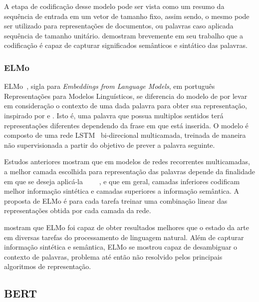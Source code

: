 A etapa de codificação desse modelo pode ser vista como um resumo da sequência
de entrada em um vetor de tamanho fixo, assim sendo, o mesmo pode ser utilizado
para representações de documentos, ou palavras caso aplicada sequência de
tamanho unitário.
\citet{cho14} demostram brevemente em seu trabalho que a codificação é capaz de
capturar significados semânticos e sintático das palavras.

\subsubsection{ELMo}

ELMo~\cite{peters18}, sigla para \textit{Embeddings from Language Models}, em
português Representações para Modelos Linguísticos, se diferencia do modelo de
\citet{cho14} por levar em consideração o contexto de uma dada palavra para
obter sua representação, inspirado por \citet{peters17} e \citet{mccann17}.
Isto é, uma palavra que possua multiplos sentidos terá representações diferentes
dependendo da frase em que está inserida.
O modelo é composto de uma rede LSTM~\cite{hochreiter97} bi-direcional
multicamada, treinada de maneira não supervisionada a partir do objetivo de
prever a palavra seguinte.

Estudos anteriores mostram que em modelos de redes recorrentes multicamadas,
a melhor camada escolhida para representação das palavras depende da finalidade
em que se deseja aplicá-la
~\cite{hashimoto16}~\cite{sogaard16}~\cite{belinkov17}~\cite{melamud16}, e que
em geral, camadas inferiores codificam melhor informação sintética e camadas
superiores a informação semântica.
A proposta de ELMo é para cada tarefa treinar uma combinação linear das
representações obtida por cada camada da rede.


\citet{peters18} mostram que ELMo foi capaz de obter resultados melhores que o
estado da arte em diversas tarefas do processamento de linguagem natural.
Além de capturar informação sintética e semântica, ELMo se mostrou capaz de
desambiguar o contexto de palavras, problema até então não resolvido pelos
principais algoritmos de representação.

\subsection{BERT}

